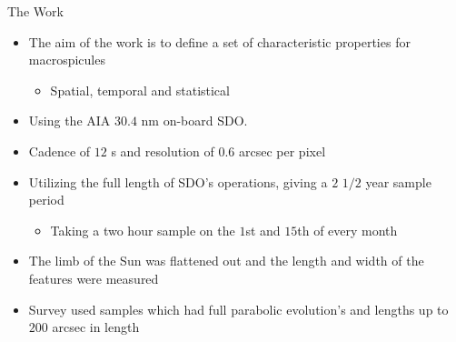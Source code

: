 \documentclass{beamer}
\begin{document}
	
	\begin{frame}{The Work}
		\begin{itemize}
			\item The aim of the work is to define a set of characteristic properties for macrospicules
				\begin{itemize}
					\item Spatial, temporal and statistical
				\end{itemize}
			\item Using the AIA $30.4$ nm on-board SDO.
			\item Cadence of $12$ s and resolution of $0.6$ arcsec per pixel 
			\item Utilizing the full length of SDO's operations, giving a $2$ $1/2$ year sample period
				\begin{itemize}
					\item Taking a two hour sample on the $1$st and $15$th of every month 
				\end{itemize}
			\item The limb of the Sun was flattened out and the length and width of the features were measured
			\item Survey used samples which had full parabolic evolution's and lengths up to $200$ arcsec in length
		\end{itemize}
	\end{frame}
\end{document}
